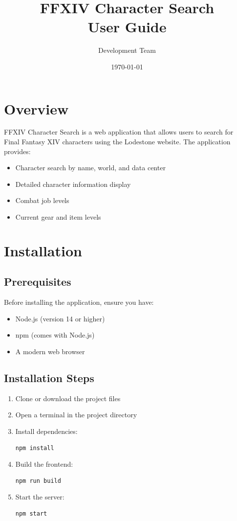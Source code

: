 \documentclass[12pt]{article}
\title{FFXIV Character Search\\User Guide}
\author{Development Team}
\date{\today}
\begin{document}
\maketitle
\tableofcontents
\newpage

\section{Overview}
FFXIV Character Search is a web application that allows users to search for Final Fantasy XIV characters using the Lodestone website. The application provides:

\begin{itemize}
    \item Character search by name, world, and data center
    \item Detailed character information display
    \item Combat job levels
    \item Current gear and item levels
\end{itemize}

\section{Installation}

\subsection{Prerequisites}
Before installing the application, ensure you have:
\begin{itemize}
    \item Node.js (version 14 or higher)
    \item npm (comes with Node.js)
    \item A modern web browser
\end{itemize}

\subsection{Installation Steps}
\begin{enumerate}
    \item Clone or download the project files
    \item Open a terminal in the project directory
    \item Install dependencies:
    \begin{lstlisting}[language=bash]
    npm install
    \end{lstlisting}
    \item Build the frontend:
    \begin{lstlisting}[language=bash]
    npm run build
    \end{lstlisting}
    \item Start the server:
    \begin{lstlisting}[language=bash]
    npm start
    \end{lstlisting}
\end{enumerate}
\end{document}
